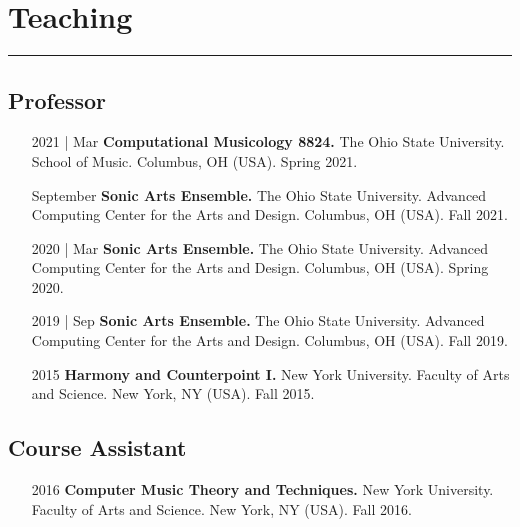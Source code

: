 \documentclass[12pt]{article}%
\begin{document}
%
\section{Teaching}%
\label{sec:Teaching}%
\hrule%
\subsection{Professor}%
\begin{itemize}[align=parleft,leftmargin=2.25cm,labelwidth=2cm]
\item[2021 | Mar]
\textbf{Computational Musicology 8824.}
The Ohio State University. 
School of Music. 
Columbus, OH (USA). 
Spring 2021.
\end{itemize}%
\begin{itemize}[align=parleft,leftmargin=2.25cm,labelwidth=2cm]
\item[September]
\textbf{Sonic Arts Ensemble.}
The Ohio State University. 
Advanced Computing Center for the Arts and Design. 
Columbus, OH (USA). 
Fall 2021.
\end{itemize}%
\begin{itemize}[align=parleft,leftmargin=2.25cm,labelwidth=2cm]
\item[2020 | Mar]
\textbf{Sonic Arts Ensemble.}
The Ohio State University. 
Advanced Computing Center for the Arts and Design. 
Columbus, OH (USA). 
Spring 2020.
\end{itemize}%
\begin{itemize}[align=parleft,leftmargin=2.25cm,labelwidth=2cm]
\item[2019 | Sep]
\textbf{Sonic Arts Ensemble.}
The Ohio State University. 
Advanced Computing Center for the Arts and Design. 
Columbus, OH (USA). 
Fall 2019.
\end{itemize}%
\begin{itemize}[align=parleft,leftmargin=2.25cm,labelwidth=2cm]
\item[2015]
\textbf{Harmony and Counterpoint I.}
New York University. 
Faculty of Arts and Science. 
New York, NY (USA). 
Fall 2015.
\end{itemize}%
\subsection{Course Assistant}%
\begin{itemize}[align=parleft,leftmargin=2.25cm,labelwidth=2cm]
\item[2016]
\textbf{Computer Music Theory and Techniques.}
New York University. 
Faculty of Arts and Science. 
New York, NY (USA). 
Fall 2016.
\end{itemize}%
\end{document}
